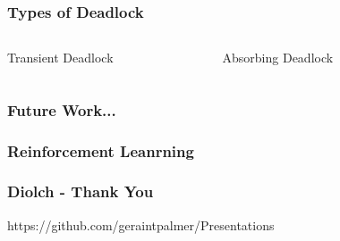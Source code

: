 \documentclass{beamer}
\begin{document}
\begin{frame}
    \frametitle{Types of Deadlock}
    \begin{columns}
        \center
        Transient Deadlock
        \begin{figure}
        
        \end{figure}
        \center
        Absorbing Deadlock
        \begin{figure}
        
        \end{figure}
    \end{columns}
\end{frame}

\begin{frame}
    \frametitle{Future Work...}
    \begin{figure}
    
    \end{figure}
\end{frame}


\begin{frame}
    \frametitle{Reinforcement Leanrning}
\end{frame}

\begin{frame}
    \frametitle{Diolch - Thank You}
    https://github.com/geraintpalmer/Presentations
\end{frame}
\end{document}
